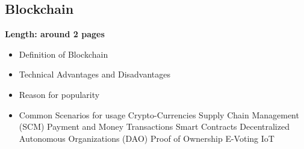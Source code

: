 \subsection{Blockchain}
\label{subsec:02_blockchain}

\textbf{Length: around 2 pages}

\begin{itemize}
  \item Definition of Blockchain
  \item Technical Advantages and Disadvantages
  \item Reason for popularity
  \item Common Scenarios for usage
  \subitem Crypto-Currencies
  \subitem Supply Chain Management (SCM)
  \subitem Payment and Money Transactions
  \subitem Smart Contracts
  \subitem Decentralized Autonomous Organizations (DAO)
  \subitem Proof of Ownership
  \subitem E-Voting
   \subitem IoT

\end{itemize}
